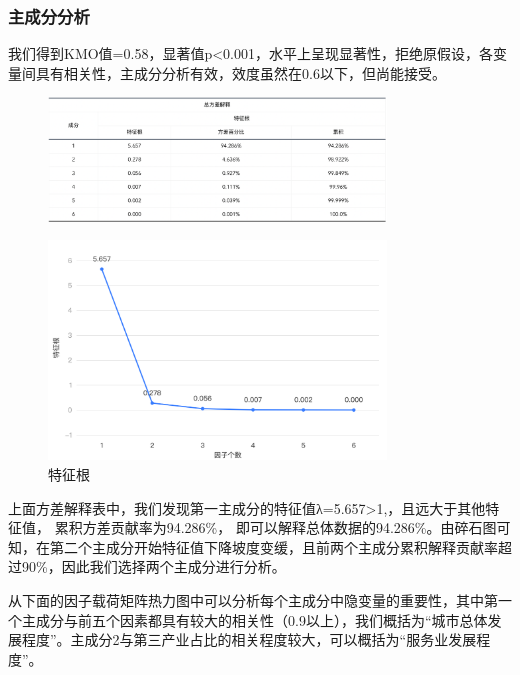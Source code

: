 \documentclass[12pt, a4paper, oneside]{ctexart}
\begin{document}
\subsubsection{主成分分析}
我们得到KMO值=0.58，显著值p<0.001，水平上呈现显著性，拒绝原假设，各变量间具有相关性，主成分分析有效，效度虽然在0.6以下，但尚能接受。
\begin{figure}[h]
    \centering
    \includegraphics[width=0.8\textwidth]{pic/KMO.png}
    \label{fig:方差解释表}
\end{figure}
\begin{figure}[h]
    \centering
    \includegraphics[width=0.8\textwidth]{pic/特征根.png}
    \caption{特征根}
    \label{fig:特征根}
\end{figure}

上面方差解释表中，我们发现第一主成分的特征值λ=5.657>1,，且远大于其他特征值， 累积方差贡献率为94.286\%， 即可以解释总体数据的94.286\%。由碎石图可知，在第二个主成分开始特征值下降坡度变缓，且前两个主成分累积解释贡献率超过90\%，因此我们选择两个主成分进行分析。

从下面的因子载荷矩阵热力图中可以分析每个主成分中隐变量的重要性，其中第一个主成分与前五个因素都具有较大的相关性（0.9以上），我们概括为“城市总体发展程度”。主成分2与第三产业占比的相关程度较大，可以概括为“服务业发展程度”。
\end{document}
